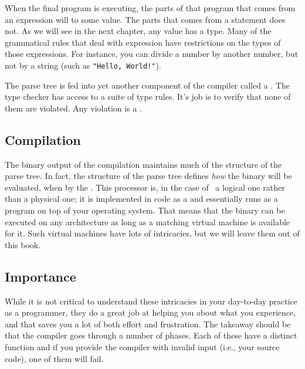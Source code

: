 When the final program is executing, the parts of that program that comes from an expression will  to some value. The parts that comes from a statement does not. As we will see in the next chapter, any value has a type. Many of the grammatical rules that deal with expression have restrictions on the types of those expressions. For instance, you can divide a number by another number, but not by a string (such as \texttt{"Hello, World!"}).

The parse tree is fed into yet another component of the compiler called a . The type checker has access to a suite of type rules. It's job is to verify that none of them are violated. Any violation is a .

\subsection{Compilation}

The binary output of the compilation maintains much of the structure of the parse tree. In fact, the structure of the parse tree defines \textsl{how} the binary will be evaluated, when  by the . This processor is, in the case of \csharp\ a logical one rather than a physical one; it is implemented in code as a  and essentially runs as a program on top of your operating system. That means that the binary can be executed on any architecture as long as a matching virtual machine is available for it. Such virtual machines have lots of intricacies, but we will leave them out of this book.

\subsection{Importance}

While it is not critical to understand these intricacies in your day-to-day practice as a programmer, they do a great job at helping you  about what you experience, and that saves you a lot of both effort and frustration. The takeaway should be that the compiler goes through a number of phases. Each of these have a distinct function and if you provide the compiler with invalid input (i.e., your source code), one of them will fail.

